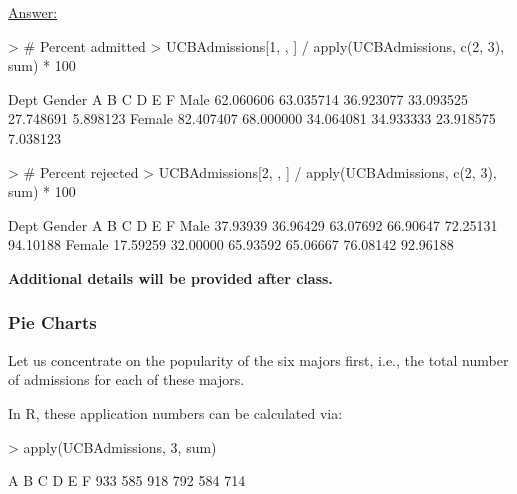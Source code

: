 \documentclass[12pt,letterpaper,final]{article}
\begin{document}
\underline{Answer:} \\
\if{}
\begin{Schunk}
\begin{Sinput}
> # Percent admitted
> UCBAdmissions[1, , ] / apply(UCBAdmissions, c(2, 3), sum) * 100
\end{Sinput}
\begin{Soutput}
        Dept
Gender           A         B         C         D         E         F
  Male   62.060606 63.035714 36.923077 33.093525 27.748691  5.898123
  Female 82.407407 68.000000 34.064081 34.933333 23.918575  7.038123
\end{Soutput}
\begin{Sinput}
> # Percent rejected
> UCBAdmissions[2, , ] / apply(UCBAdmissions, c(2, 3), sum) * 100
\end{Sinput}
\begin{Soutput}
        Dept
Gender          A        B        C        D        E        F
  Male   37.93939 36.96429 63.07692 66.90647 72.25131 94.10188
  Female 17.59259 32.00000 65.93592 65.06667 76.08142 92.96188
\end{Soutput}
\end{Schunk}
\else
{\bf Additional details will be provided after class.}
\fi


\newpage


\subsubsection{Pie Charts}


Let us concentrate on the popularity of the six majors first,
i.e., the total number of admissions for each of these majors.

In R, these application numbers can be calculated via:
\begin{Schunk}
\begin{Sinput}
> apply(UCBAdmissions, 3, sum)
\end{Sinput}
\begin{Soutput}
  A   B   C   D   E   F 
933 585 918 792 584 714 
\end{Soutput}
\end{Schunk}
\end{document}
